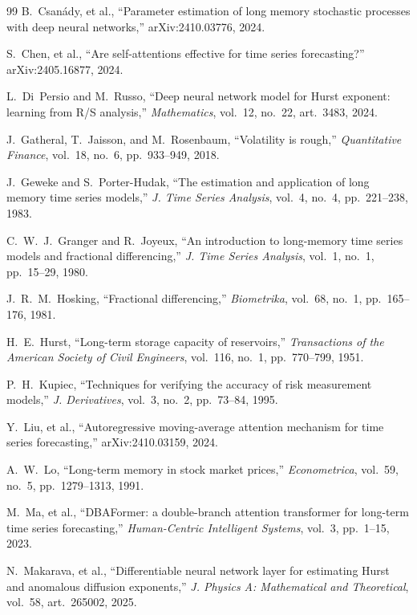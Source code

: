 \documentclass[journal]{IEEEtran}
\begin{document}
\begin{thebibliography}{99}
B.~Csan\'ady, et al., ``Parameter estimation of long memory stochastic processes with deep neural
networks,'' arXiv:2410.03776, 2024.

S.~Chen, et al., ``Are self-attentions effective for time series forecasting?'' arXiv:2405.16877,
2024.

L.~Di~Persio and M.~Russo, ``Deep neural network model for Hurst exponent: learning from R/S
analysis,'' \textit{Mathematics}, vol.~12, no.~22, art.~3483, 2024.

J.~Gatheral, T.~Jaisson, and M.~Rosenbaum, ``Volatility is rough,'' \textit{Quantitative
Finance}, vol.~18, no.~6, pp.~933--949, 2018.

J.~Geweke and S.~Porter-Hudak, ``The estimation and application of long memory time series
models,'' \textit{J. Time Series Analysis}, vol.~4, no.~4, pp.~221--238, 1983.

C.~W.~J.~Granger and R.~Joyeux, ``An introduction to long-memory time series models and
fractional differencing,'' \textit{J. Time Series Analysis}, vol.~1, no.~1, pp.~15--29, 1980.

J.~R.~M.~Hosking, ``Fractional differencing,'' \textit{Biometrika}, vol.~68, no.~1, pp.~165--176,
1981.

H.~E.~Hurst, ``Long-term storage capacity of reservoirs,'' \textit{Transactions of the American
Society of Civil Engineers}, vol.~116, no.~1, pp.~770--799, 1951.

P.~H.~Kupiec, ``Techniques for verifying the accuracy of risk measurement models,''
\textit{J. Derivatives}, vol.~3, no.~2, pp.~73--84, 1995.

Y.~Liu, et al., ``Autoregressive moving-average attention mechanism for time series
forecasting,'' arXiv:2410.03159, 2024.

A.~W.~Lo, ``Long-term memory in stock market prices,'' \textit{Econometrica}, vol.~59, no.~5,
pp.~1279--1313, 1991.

M.~Ma, et al., ``DBAFormer: a double-branch attention transformer for long-term time series
forecasting,'' \textit{Human-Centric Intelligent Systems}, vol.~3, pp.~1--15, 2023.

N.~Makarava, et al., ``Differentiable neural network layer for estimating Hurst and anomalous
diffusion exponents,'' \textit{J. Physics A: Mathematical and Theoretical}, vol.~58, art.~265002,
2025.


\end{thebibliography}
\end{document}
